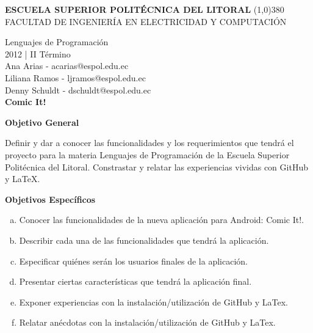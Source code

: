 \documentclass[12pt]{report}
\begin{document}
	\setlength{\topmargin}{-0.5in}
	\pagestyle{empty}
	\begin{center}
		\textbf{
			\vspace{-0.7em}
			ESCUELA SUPERIOR POLITÉCNICA DEL LITORAL
		}
		\line(1,0){380}\\		
		\scriptsize{FACULTAD DE INGENIERÍA EN ELECTRICIDAD Y COMPUTACIÓN}
	\end{center}
	\begin{center}
		\vspace{2.5em}
		Lenguajes de Programación
		\\2012 | II Término
		\vspace{1.5em}
		\\Ana Arias - acarias@espol.edu.ec
		\vspace{2mm}
		\\Liliana Ramos - ljramos@espol.edu.ec
		\\Denny Schuldt - dschuldt@espol.edu.ec
		\vspace{3em}
		\Large{\textbf{\\Comic It!	\vspace{2em}}}
	\end{center}
	


	\begingroup
		\large{
			\textbf{
				Objetivo General
				\newline
				\newline
			}
		}
	\endgroup

	Definir y dar a conocer las funcionalidades y los requerimientos que tendrá el proyecto para la materia Lenguajes de Programación de la Escuela Superior Politécnica del Litoral. 
Constrastar y relatar las experiencias vividas con GitHub y LaTeX.
	\vspace{7mm}

	\begingroup
		\large{
			\textbf{
				Objetivos Específicos
				\newline
				\newline
			}
		}
	\endgroup
		\begin{enumerate}[(a)]%
		\item Conocer las funcionalidades de la nueva aplicación para Android: Comic It!.
		\item Describir cada una de las funcionalidades que tendrá la aplicación.
		\item Especificar quiénes serán los usuarios finales de la aplicación.
		\item Presentar ciertas características que tendrá la aplicación final.
		\item Exponer experiencias con la instalación/utilización de GitHub y LaTex.
		\item Relatar anécdotas con la instalación/utilización de GitHub y LaTex.
		\end{enumerate}
	
\end{document}
